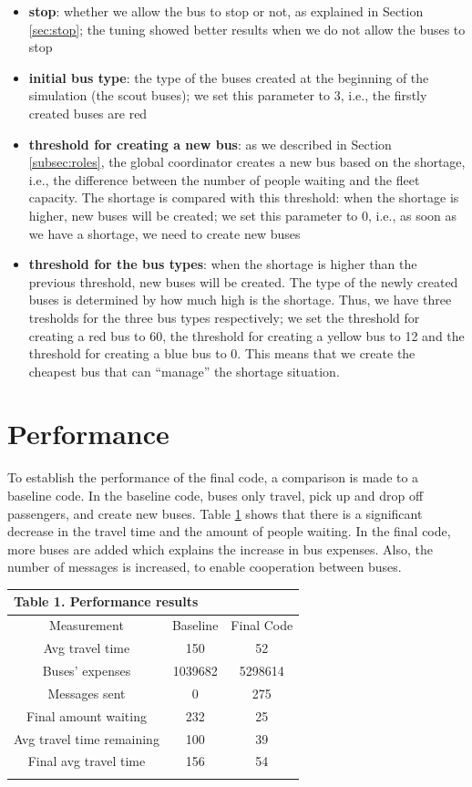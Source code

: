 \documentclass[a4paper]{article}
\begin{document}
\begin{itemize}
\item \textbf{stop}: whether we allow the bus to stop or not, as explained in Section \ref{sec:stop}; the tuning showed better results when we do not allow the buses to stop
\item \textbf{initial bus type}: the type of the buses created at the beginning of the simulation (the scout buses); we set this parameter to 3, i.e., the firstly created buses are red
\item \textbf{threshold for creating a new bus}: as we described in Section \ref{subsec:roles}, the global coordinator creates a new bus based on the shortage, i.e., the difference between the number of people waiting and the fleet capacity. The shortage is compared with this threshold: when the shortage is higher, new buses will be created; we set this parameter to 0, i.e., as soon as we have a shortage, we need to create new buses
\item \textbf{threshold for the bus types}: when the shortage is higher than the previous threshold, new buses will be created. The type of the newly created buses is determined by how much high is the shortage. Thus, we have three tresholds for the three bus types respectively; we set the threshold for creating a red bus to 60, the threshold for creating a yellow bus to 12 and the threshold for creating a blue bus to 0. This means that we create the cheapest bus that can ``manage'' the shortage situation. 
\end{itemize}

\section{Performance}

To establish the performance of the final code, a comparison is made to a baseline code. In the baseline code, buses only travel, pick up and drop off passengers, and create new buses. Table \ref{table:table1} shows that there is a significant decrease in the travel time and the amount of people waiting. In the final code, more buses are added which explains the increase in bus expenses. Also, the number of messages is increased, to enable cooperation between buses. 

\begin{table}
\begin{tabular}{ |c|c|c|  }
 \hline
 \multicolumn{4}{|l|}{Table 1. Performance results} \\
 \hline
  Measurement & Baseline & Final Code \\
 \hline
  Avg travel time & 150 & 52 \\
  Buses' expenses & 1039682 & 5298614 \\
  Messages sent & 0 & 275  \\
  Final amount waiting & 232 & 25 \\
  Avg travel time remaining & 100 & 39 \\
  Final avg travel time & 156 & 54 \\
 \hline
\label{table:table1}
\end{tabular}
\end{table}
\end{document}
